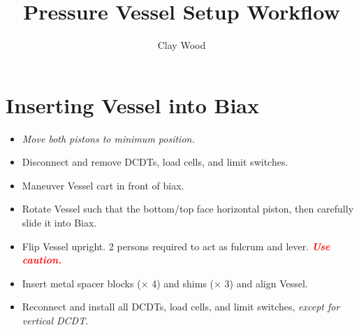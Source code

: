 \documentclass{article}
\title{Pressure Vessel Setup Workflow}
\author{Clay Wood}
\date{}
\newcommand{\caution}{
	\textbf{\textit{ \textcolor{red}{Use caution.} }}
}
\begin{document}
	
\maketitle

\tableofcontents

\section{Inserting Vessel into Biax}
\begin{itemize}
	\item \textit{Move both pistons to minimum position.}
	\item Disconnect and remove DCDTs,  load cells, and limit switches.
	\item Maneuver Vessel cart in front of biax.
	\item Rotate Vessel such that the bottom/top face horizontal piston, then carefully slide it into Biax.
	\item Flip Vessel upright. 2 persons required to act as fulcrum and lever. \caution
	\item Insert metal spacer blocks ($ \times $ 4) and shims ($\times $ 3) and align Vessel.
	\item Reconnect and install all DCDTs, load cells, and limit switches, \textit{except for vertical DCDT}.
\end{itemize}
\end{document}
